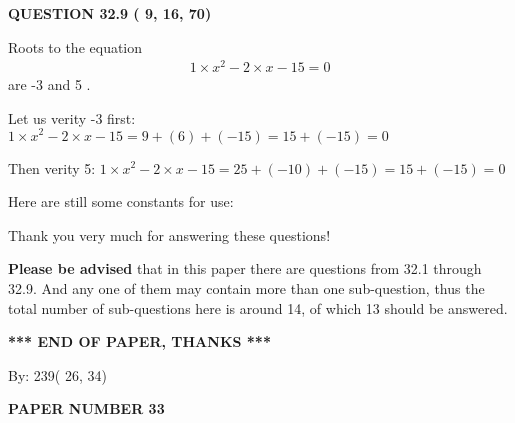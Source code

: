 \documentclass[12pt]{article}
\begin{document}
 
 
  
\vspace{0.2in}
  
{\textbf{\Large{QUESTION
32.9 
 (          9,         16,         70)
}}}
  
  


 
 

Roots to the equation
\begin{eqnarray*}
1 \times x^2  %
-2
                 \times x    %
-15 =0
\end{eqnarray*}
are  %
-3 and  %
5 .
 
Let us verity  %
-3 first:
$  %
1 \times x^2  %
-2
                 \times x    %
-15
  = %
9+( %
6)+( %
-15)
  = %
15+( %
-15)
  = %
0
$
 
Then verity  %
5:
$  %
1 \times x^2  %
-2
                 \times x    %
-15
  = %
25+( %
-10)+( %
-15)
  = %
15+( %
-15)
  = %
0
$
 
 
 
   
   
 \vspace{0.2in}
Here are still some constants for use:
 
 
 
 
Thank you very much for answering these questions!
 
{\textbf{\large{Please be advised}}} that in this paper there are questions from
32.1 through
32.9.
And any one of them may contain more than one sub-question, thus the total number
of sub-questions here is around 14, of which
13 should be answered.
 
   
   
   
   
\vspace{1.0in} 
{\textbf{\large{ *** END OF PAPER, THANKS *** }}} 
   
   
\hspace{1.0in} By: 
         239(         26,          34)
   
   
   
   
\newpage 
\setcounter{page}{ 
    33001 } 
   
   
   
   
 {\textbf{ \Large{ PAPER NUMBER          33 }}}
   
   
\vspace{0.2in}
   
   
   
\end{document}
